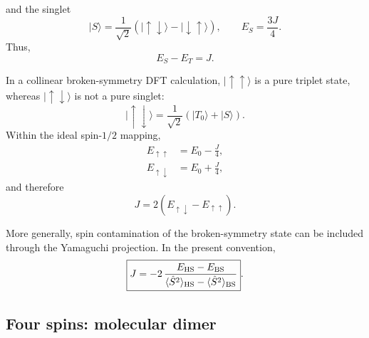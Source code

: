 and the singlet
\begin{equation}
    |S\rangle=
    \frac{1}{\sqrt{2}}
    \left(
        |\uparrow\downarrow\rangle-
        |\downarrow\uparrow\rangle
    \right),
    \qquad
    E_S=\frac{3J}{4}.
\end{equation}
Thus,
\begin{equation}
    E_S-E_T=J.
\end{equation}

In a collinear broken-symmetry DFT calculation,
$|\uparrow\uparrow\rangle$ is a pure triplet state, whereas
$|\uparrow\downarrow\rangle$ is not a pure singlet:
\begin{equation}
    |\uparrow\downarrow\rangle
    =
    \frac{1}{\sqrt{2}}
    \left(
        |T_0\rangle+|S\rangle
    \right).
\end{equation}
Within the ideal spin-$1/2$ mapping,
\begin{align}
    E_{\uparrow\uparrow} &= E_0-\frac{J}{4},\\
    E_{\uparrow\downarrow} &= E_0+\frac{J}{4},
\end{align}
and therefore
\begin{equation}
    \boxed{
    J=2\left(
        E_{\uparrow\downarrow}
        -E_{\uparrow\uparrow}
    \right)}.
    \label{eq:J_two_spin_BS}
\end{equation}

\noindent More generally, spin contamination of the broken-symmetry state can be
included through the Yamaguchi projection. In the present convention,
\begin{equation}
    \boxed{
    J=
    -2\,
    \frac{E_{\rm HS}-E_{\rm BS}}
    {
    \langle \hat S^2\rangle_{\rm HS}
    -
    \langle \hat S^2\rangle_{\rm BS}
    }}.
    \label{eq:yamaguchi_our_convention}
\end{equation}


\subsection{Four spins: molecular dimer}

